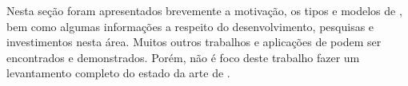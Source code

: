 Nesta seção foram apresentados brevemente a motivação, os tipos e modelos de \vants, bem como algumas informações a respeito do desenvolvimento, pesquisas e investimentos nesta área. Muitos outros trabalhos e aplicações de \vants podem ser encontrados e demonstrados. Porém, não é foco deste trabalho fazer um levantamento completo do estado da arte de \uavs. 